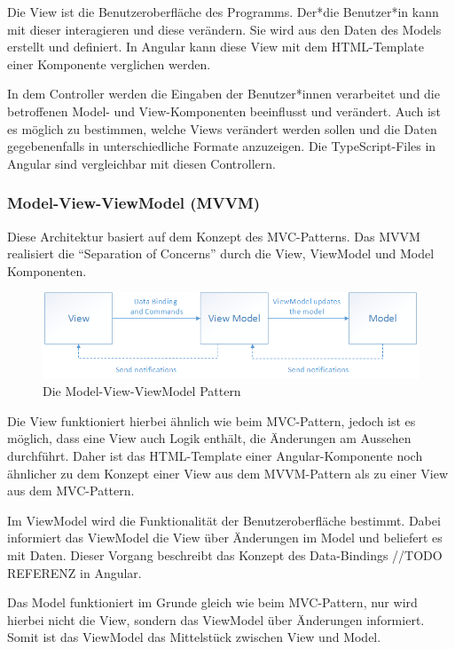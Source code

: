 Die View ist die Benutzeroberfläche des Programms. Der*die Benutzer*in kann mit dieser interagieren und diese verändern. Sie wird aus den Daten des Models erstellt und definiert. In Angular kann diese View mit dem HTML-Template einer Komponente verglichen werden.

In dem Controller werden die Eingaben der Benutzer*innen verarbeitet und die betroffenen Model- und View-Komponenten beeinflusst und verändert. Auch ist es möglich zu bestimmen, welche Views verändert werden sollen und die Daten gegebenenfalls in unterschiedliche Formate anzuzeigen. Die TypeScript-Files in Angular sind vergleichbar mit diesen Controllern.
\cite{MVC}

\subsubsection{Model-View-ViewModel (MVVM)}
Diese Architektur basiert auf dem Konzept des MVC-Patterns. Das MVVM realisiert die “Separation of Concerns” durch die View, ViewModel und Model Komponenten.

\begin{figure} [h t]
  \centering
  \includegraphics[scale=0.5]{pics/mvvm-pattern.png}
  \caption{Die Model-View-ViewModel Pattern \cite{MVVM}}
  \label{fig:tech:front:mvc-architecture}
\end{figure}

Die View funktioniert hierbei ähnlich wie beim MVC-Pattern, jedoch ist es möglich, dass eine View auch Logik enthält, die Änderungen am Aussehen durchführt. Daher ist das HTML-Template einer Angular-Komponente noch ähnlicher zu dem Konzept einer View aus dem MVVM-Pattern als zu einer View aus dem MVC-Pattern. 

Im ViewModel wird die Funktionalität der Benutzeroberfläche bestimmt. Dabei informiert das ViewModel die View über Änderungen im Model und beliefert es mit Daten. Dieser Vorgang beschreibt das Konzept des Data-Bindings //TODO REFERENZ in Angular.  

Das Model funktioniert im Grunde gleich wie beim MVC-Pattern, nur wird hierbei nicht die View, sondern das ViewModel über Änderungen informiert. Somit ist das ViewModel das Mittelstück zwischen View und Model.


